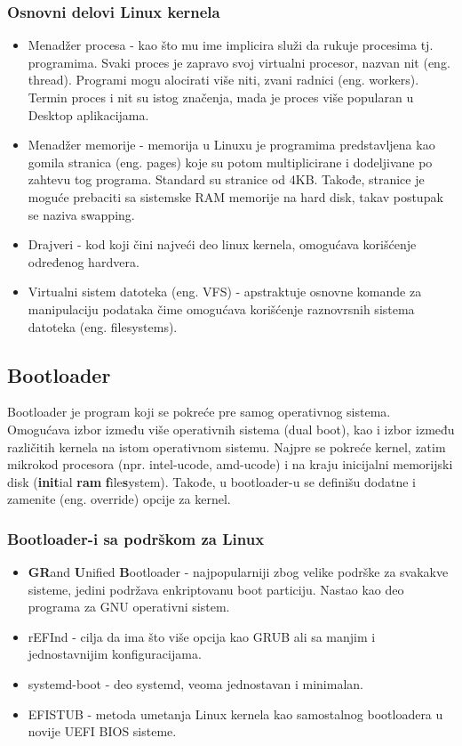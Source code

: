 \documentclass[a4paper,14pt]{article}
\begin{document}
\subsubsection{Osnovni delovi Linux kernela}
\begin{itemize}
\item Menadžer procesa - kao što mu ime implicira služi da rukuje procesima tj. programima. Svaki proces je zapravo svoj virtualni procesor, nazvan nit (eng. thread). Programi mogu alocirati više niti, zvani radnici (eng. workers). Termin proces i nit su istog značenja, mada je proces više popularan u Desktop aplikacijama.
\item Menadžer memorije - memorija u Linuxu je programima predstavljena kao gomila stranica (eng. pages) koje su potom multiplicirane i dodeljivane po zahtevu tog programa. Standard su stranice od 4KB. Takođe, stranice je moguće prebaciti sa sistemske RAM memorije na hard disk, takav postupak se naziva swapping.
\item Drajveri - kod koji čini najveći deo linux kernela, omogućava korišćenje određenog hardvera.
\item Virtualni sistem datoteka (eng. VFS) - apstraktuje osnovne komande za manipulaciju podataka čime omogućava korišćenje raznovrsnih sistema datoteka (eng. filesystems).
\end{itemize}
\newpage

\subsection{Bootloader}
Bootloader je program koji se pokreće pre samog operativnog sistema. Omogućava izbor između više operativnih sistema (dual boot), kao i izbor između različitih kernela na istom operativnom sistemu. Najpre se pokreće kernel, zatim mikrokod procesora (npr. intel-ucode, amd-ucode) i na kraju inicijalni memorijski disk (\textbf{init}ial \textbf{ram} \textbf{f}ile\textbf{s}ystem). Takođe, u bootloader-u se definišu dodatne i zamenite (eng. override) opcije za kernel.
\subsubsection{Bootloader-i sa podrškom za Linux}
\begin{itemize}
\item \textbf{GR}and \textbf{U}nified \textbf{B}ootloader - najpopularniji zbog velike podrške za svakakve sisteme, jedini podržava enkriptovanu boot particiju. Nastao kao deo programa za GNU operativni sistem.
\item rEFInd - cilja da ima što više opcija kao GRUB ali sa manjim i jednostavnijim konfiguracijama.
\item systemd-boot - deo systemd, veoma jednostavan i minimalan.
\item EFISTUB - metoda umetanja Linux kernela kao samostalnog bootloadera u novije UEFI BIOS sisteme.
\end{itemize}
\end{document}
